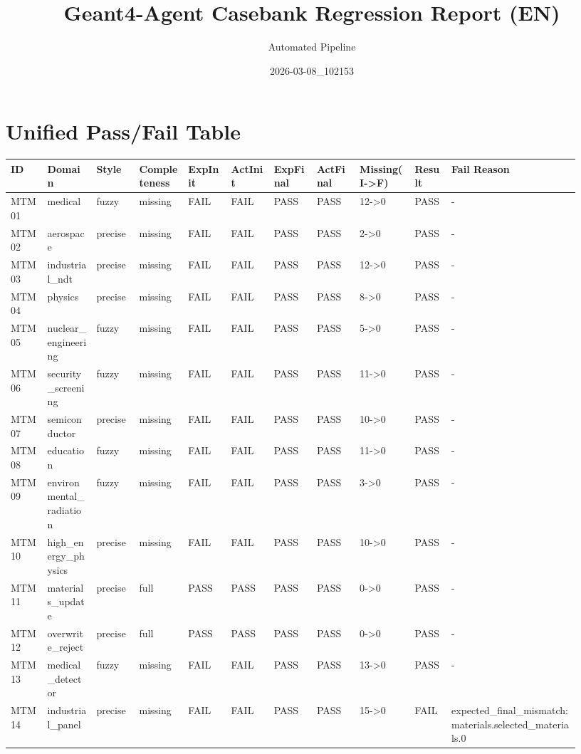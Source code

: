 \documentclass[11pt]{ctexart}
\title{Geant4-Agent Casebank Regression Report (EN)}
\author{Automated Pipeline}
\date{2026-03-08\_102153}
\begin{document}
\maketitle
\section{Unified Pass/Fail Table}
\begin{longtable}{p{0.06\linewidth}p{0.08\linewidth}p{0.07\linewidth}p{0.08\linewidth}p{0.07\linewidth}p{0.07\linewidth}p{0.07\linewidth}p{0.07\linewidth}p{0.09\linewidth}p{0.06\linewidth}p{0.21\linewidth}}
\toprule
ID & Domain & Style & Completeness & ExpInit & ActInit & ExpFinal & ActFinal & Missing(I->F) & Result & Fail Reason \\
\midrule
MTM01 & medical & fuzzy & missing & FAIL & FAIL & PASS & PASS & 12->0 & PASS & - \\
MTM02 & aerospace & precise & missing & FAIL & FAIL & PASS & PASS & 2->0 & PASS & - \\
MTM03 & industrial\_ndt & precise & missing & FAIL & FAIL & PASS & PASS & 12->0 & PASS & - \\
MTM04 & physics & precise & missing & FAIL & FAIL & PASS & PASS & 8->0 & PASS & - \\
MTM05 & nuclear\_engineering & fuzzy & missing & FAIL & FAIL & PASS & PASS & 5->0 & PASS & - \\
MTM06 & security\_screening & fuzzy & missing & FAIL & FAIL & PASS & PASS & 11->0 & PASS & - \\
MTM07 & semiconductor & precise & missing & FAIL & FAIL & PASS & PASS & 10->0 & PASS & - \\
MTM08 & education & fuzzy & missing & FAIL & FAIL & PASS & PASS & 11->0 & PASS & - \\
MTM09 & environmental\_radiation & fuzzy & missing & FAIL & FAIL & PASS & PASS & 3->0 & PASS & - \\
MTM10 & high\_energy\_physics & precise & missing & FAIL & FAIL & PASS & PASS & 10->0 & PASS & - \\
MTM11 & materials\_update & precise & full & PASS & PASS & PASS & PASS & 0->0 & PASS & - \\
MTM12 & overwrite\_reject & precise & full & PASS & PASS & PASS & PASS & 0->0 & PASS & - \\
MTM13 & medical\_detector & fuzzy & missing & FAIL & FAIL & PASS & PASS & 13->0 & PASS & - \\
MTM14 & industrial\_panel & precise & missing & FAIL & FAIL & PASS & PASS & 15->0 & FAIL & expected\_final\_mismatch:materials.selected\_materials.0 \\

\end{longtable}
\end{document}

